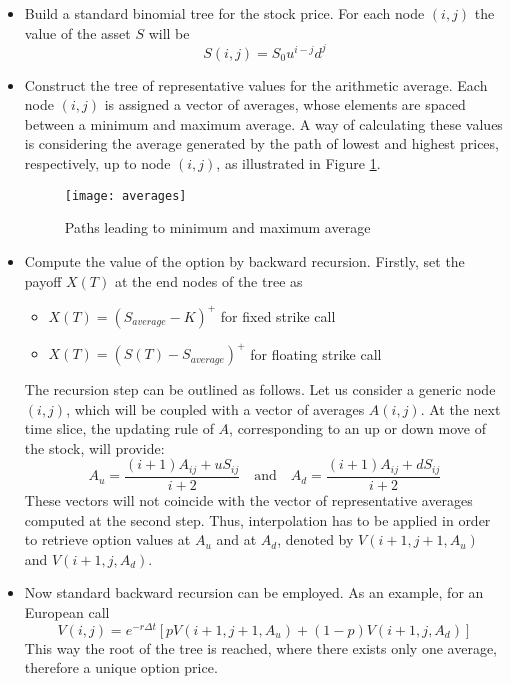 \documentclass[12pt]{article}
\numberwithin{equation}{section}
\begin{document}
\begin{itemize}
\item Build a standard binomial tree for the stock price. For each node $(i,j)$ the value of the asset $S$ will be
\begin{equation*}
S(i,j) = S_0u^{i-j}d^j
\end{equation*}
\item Construct the tree of representative values for the arithmetic average. Each node $(i,j)$ is assigned a vector of averages, whose elements are spaced between a minimum and maximum average. A way of calculating these values is considering the average generated by the path of lowest and highest prices, respectively, up to node $(i,j)$, as illustrated in Figure \ref{averages}.
\begin{figure}[h]
	\centering
	\texttt{[image: averages]}
	\caption{Paths leading to minimum and maximum average}
	\label{averages}
\end{figure}
\item Compute the value of the option by backward recursion. Firstly, set the payoff $X(T)$ at the end nodes of the tree as
\newpage
\begin{itemize}
\item $X(T) = (S_{average}-K)^+$ for fixed strike call
\item $X(T) = (S(T)-S_{average})^+$ for floating strike call
\end{itemize}
The recursion step can be outlined as follows. Let us consider a generic node $(i,j)$, which will be coupled with a vector of averages $A(i,j)$. At the next time slice, the updating rule of $A$, corresponding to an up or down move of the stock, will provide:
\begin{equation*}
A_{u} = \frac{(i+1)A_{ij} + uS_{ij}}{i+2} \quad \text{and} \quad A_{d} = \frac{(i+1)A_{ij} + dS_{ij}}{i+2}
\end{equation*}
These vectors will not coincide with the vector of representative averages computed at the second step. Thus, interpolation has to be applied in order to retrieve option values at $A_{u}$ and at $A_{d}$, denoted by $V(i+1,j+1,A_{u})$ and $V(i+1,j,A_{d})$.
\item Now standard backward recursion can be employed. As an example, for an European call
\begin{equation*}
V(i,j) = e^{-r\Delta t}[pV(i+1,j+1,A_{u}) + (1-p)V(i+1,j,A_{d})]
\end{equation*}
This way the root of the tree is reached, where there exists only one average, therefore a unique option price.
\end{itemize}
\end{document}
